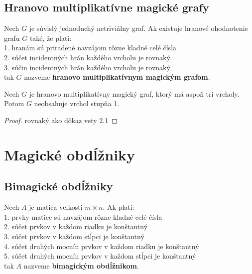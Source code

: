 \subsection{Hranovo multiplikatívne magické grafy}

\begin{subdefinition} Nech $G$ je súvislý jednoduchý netriviálny graf. Ak existuje hranové ohodnotenie grafu $G$ také, že platí: \\
1. hranám sú priradené navzájom rôzne kladné celé čísla \\
2. súčet incidentných hrán každého vrcholu je rovnaký \\
3. súčin incidentných hrán každého vrcholu je rovnaký \\
tak $G$ nazveme \textbf{hranovo multiplikatívnym magickým grafom}.
\end{subdefinition} 

\begin{subtheorem} Nech $G$ je hranovo multiplikatívny magický graf, ktorý má aspoň tri vrcholy. Potom $G$ neobsahuje vrchol stupňa 1.
\end{subtheorem}

\begin{proof} rovnaký ako dôkaz vety 2.1
\end{proof} 

\section{Magické obdĺžniky}

\subsection{Bimagické obdĺžniky}

\begin{subdefinition} Nech $A$ je matica veľkosti $m \times n$. Ak platí: \\
1. prvky matice sú navzájom rôzne kladné celé čísla \\
2. súčet prvkov v každom riadku je konštantný \\
3. súčet prvkov v každom stĺpci je konštantný \\
4. súčet druhých mocnín prvkov v každom riadku je konštantný \\
5. súčet druhých mocnín prvkov v každom stĺpci je konštantný \\
tak $A$ nazveme \textbf{bimagickým obdĺžnikom}.
\end{subdefinition} 

